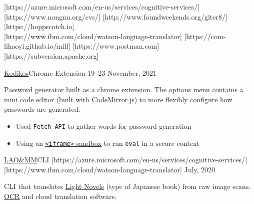 \documentclass[10pt,a4paper,ragged2e,withhyper]{altacv}
\begin{document}
\begin{paracol}{2}
		[https://azure.microsoft.com/en-us/services/cognitive-services/]
		 \\ %
		[https://www.nongnu.org/cvs/]
		[http://www.foundweekends.org/giter8/]
		[https://hoppscotch.io] \\ %
		[https://www.ibm.com/cloud/watson-language-translator]
		[https://com-lihaoyi.github.io/mill]
		[https://www.postman.com]
		[https://subversion.apache.org]



		\cvevent
		{\href{https://github.com/jaacko-torus/kodikos/}{\uline{Kodikos}}{\hr}Chrome Extension}
		{{\CVTagHTMLCSS}{\CVTagJavaScript}}
		{19--23 November, 2021}{}
		\vspace{-0.3cm}
		\begin{justify}
			Password generator built as a chrome extension. The options menu contains a mini code editor (built with \href{https://codemirror.net/}{\uline{CodeMirror.js}}) to more flexibly configure how passwords are generated.
		\end{justify}
		\vspace{-0.2cm}
		\smallskip
		\begin{itemize}
			\item Used \texttt{Fetch API} to gather words for password generation
			\item Using an \href{https://developer.mozilla.org/en-US/docs/Web/HTTP/Headers/Content-Security-Policy/sandbox/}{\uline{\texttt{<iframe>} sandbox}} to run \texttt{eval} in a secure context
		\end{itemize}

		\divider

		\cvevent
		{\href{https://github.com/jaacko-torus/lao-mm/}{\uline{LAO\&MM}}{\hr}CLI}
		{{\CVTagRuby}{\CVTagOCRA}{[https://azure.microsoft.com/en-us/services/cognitive-services/]}\\{[https://www.ibm.com/cloud/watson-language-translator]}}
		{July, 2020}{}
		\vspace{-0.3cm}
		\begin{justify}
			CLI that translates \href{https://en.wikipedia.org/wiki/Light_novel}{\uline{Light Novels}} (type of Japanese book) from raw image scans. \href{http://capture2text.sourceforge.net/}{\uline{OCR}} and cloud translation software.
		\end{justify}


\end{paracol}
\end{document}

